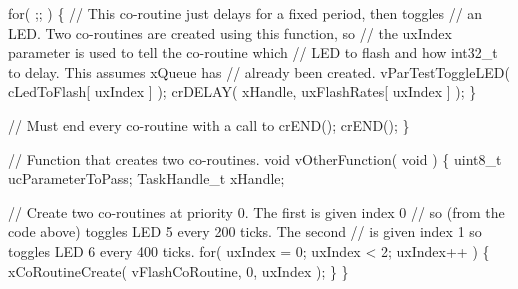 \begin{DoxyPre}     for( ;; )
     \{
         // This co-routine just delays for a fixed period, then toggles
         // an LED.  Two co-routines are created using this function, so
         // the uxIndex parameter is used to tell the co-routine which
         // LED to flash and how int32\_t to delay.  This assumes xQueue has
         // already been created.
         vParTestToggleLED( cLedToFlash[ uxIndex ] );
         crDELAY( xHandle, uxFlashRates[ uxIndex ] );
     \}\end{DoxyPre}



\begin{DoxyPre}     // Must end every co-routine with a call to crEND();
     crEND();
     \}\end{DoxyPre}



\begin{DoxyPre}    // Function that creates two co-routines.
    void vOtherFunction( void )
    \{
    uint8\_t ucParameterToPass;
    TaskHandle\_t xHandle;\end{DoxyPre}



\begin{DoxyPre}     // Create two co-routines at priority 0.  The first is given index 0
     // so (from the code above) toggles LED 5 every 200 ticks.  The second
     // is given index 1 so toggles LED 6 every 400 ticks.
     for( uxIndex = 0; uxIndex < 2; uxIndex++ )
     \{
         xCoRoutineCreate( vFlashCoRoutine, 0, uxIndex );
     \}
    \}
  \end{DoxyPre}
 